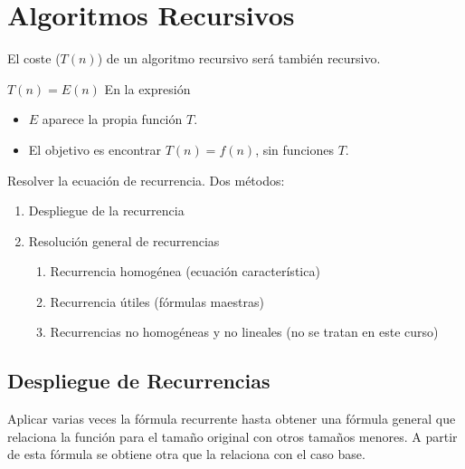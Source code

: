 \section{Algoritmos Recursivos}\label{sec:algoritmos-recursivos}

El coste ($T(n)$) de un algoritmo recursivo será también recursivo.

$T(n)= E(n)$ En la expresión 
\begin{itemize}
  \item $E$ aparece la propia función $T$.
  \item El objetivo es encontrar $T(n)= f(n)$, sin funciones $T$.
\end{itemize}

Resolver la ecuación de recurrencia. Dos métodos:
\begin{enumerate}
  \item Despliegue de la recurrencia
  \item Resolución general de recurrencias
  \begin{enumerate}
    \item Recurrencia homogénea (ecuación característica)
    \item Recurrencia útiles (fórmulas maestras)
    \item Recurrencias no homogéneas y no lineales (no se tratan en este curso)
  \end{enumerate}
  
\end{enumerate}
  
\subsection{Despliegue de Recurrencias}
Aplicar varias veces la fórmula recurrente hasta obtener una fórmula general que relaciona la función para el tamaño original con otros tamaños menores. A partir de esta fórmula se obtiene otra que la relaciona con el caso base.

